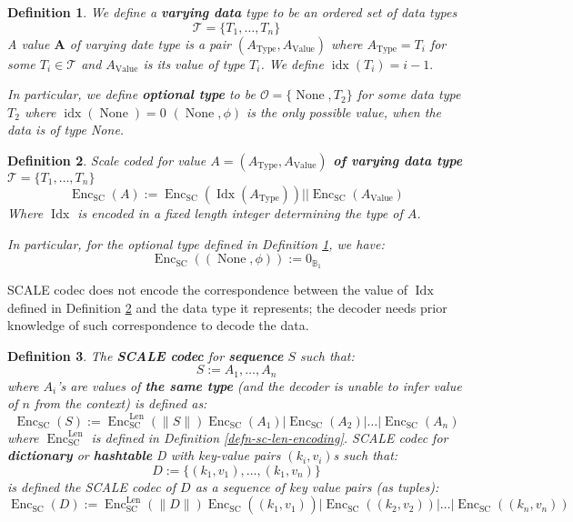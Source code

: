 \documentclass{article}
\newcommand{\assign}{:=}
\newcommand{\tmmathbf}[1]{\ensuremath{\boldsymbol{#1}}}
\newcommand{\tmop}[1]{\ensuremath{\operatorname{#1}}}
\newcommand{\tmstrong}[1]{\textbf{#1}}
\newcommand{\tmtextbf}[1]{{\bfseries{#1}}}
\newtheorem{definition}{Definition}
\providecommand{\tmop}[1]{\ensuremath{\mathrm{#1}}}
\providecommand{\tmstrong}[1]{\tmtextbf{#1}}
\providecommand{\tmtextbf}[1]{\tmtextbf{#1}}
\newtheorem{definition}{Definition}
\begin{document}
\begin{definition}
  \label{defn-varrying-data-type}We define a {\tmstrong{varying data}} type to
  be an ordered set of data types
  \[ \mathcal{T}= \{ T_1, \ldots, T_n \} \]
  A value $\tmmathbf{A}$ of varying date type is a pair $(A_{\tmop{Type}},
  A_{\tmop{Value}})$ where $A_{\tmop{Type}} = T_i$ for some $T_i \in
  \mathcal{T}$ and $A_{\tmop{Value}}$ is its value of type $T_i$. We define
  $\tmop{idx} (T_i) = i - 1.$
  
  In particular, we define {\tmstrong{optional type}} to be $\mathcal{O}= \{
  \tmop{None}, T_2 \}$ for some data type $T_2$ where $\tmop{idx}
  (\tmop{None}) = 0$ $(\tmop{None}, \phi)$ is the only possible value, when
  the data is of type None.
  
  
\end{definition}

\begin{definition}
  \label{defn-scale-variable-type}Scale coded for value {\tmstrong{$A =
  (A_{\tmop{Type}}, A_{\tmop{Value}})$ of varying data type}} $\mathcal{T}= \{
  T_1, \ldots, T_n \}$
  \[ \tmop{Enc}_{\tmop{SC}} (A) \assign \tmop{Enc}_{\tmop{SC}} (\tmop{Idx}
     (A_{\tmop{Type}})) | | \tmop{Enc}_{\tmop{SC}} (A_{\tmop{Value}}) \]
  Where $\tmop{Idx}$ is encoded in a fixed length integer determining the type
  of $A$.
  
  In particular, for the optional type defined in Definition
  \ref{defn-varrying-data-type}, we have:
  \[ \tmop{Enc}_{\tmop{SC}} ((\tmop{None}, \phi)) \assign 0_{\mathbb{B}_1} \]
\end{definition}

SCALE codec does not encode the correspondence between the value of
$\tmop{Idx}$ defined in Definition \ref{defn-scale-variable-type} and the data
type it represents; the decoder needs prior knowledge of such correspondence
to decode the data.

\begin{definition}
  \label{defn-scale-list}The {\tmstrong{SCALE codec}} for
  {\tmstrong{sequence}} $S$ such that:
  \[ S \assign A_1, \ldots, A_n \]
  where $A_i$'s are values of {\tmstrong{the same type}} (and the decoder is
  unable to infer value of $n$ from the context) is defined as:
  \[ \tmop{Enc}_{\tmop{SC}} (S) \assign \tmop{Enc}^{\tmop{Len}}_{\tmop{SC}}
     (\| S \|) \tmop{Enc}_{\tmop{SC}} (A_1) | \tmop{Enc}_{\tmop{SC}} (A_2) |
     \ldots | \tmop{Enc}_{\tmop{SC}} (A_n) \]
  where $\tmop{Enc}_{\tmop{SC}}^{\tmop{Len}}$ is defined in Definition
  \ref{defn-sc-len-encoding}. SCALE codec for {\tmstrong{dictionary}} or
  {\tmstrong{hashtable}} D with key-value pairs $(k_i, v_i)$s such that:
  \[ D \assign \{ (k_1, v_1), \ldots, (k_1, v_n) \} \]
  is defined the SCALE codec of $D$ as a sequence of key value pairs (as
  tuples):
  \[ \tmop{Enc}_{\tmop{SC}} (D) \assign \tmop{Enc}^{\tmop{Len}}_{\tmop{SC}}
     (\| D \|) \tmop{Enc}_{\tmop{SC}} ((k_1, v_1)_{}) | \tmop{Enc}_{\tmop{SC}}
     ((k_2, v_2)) | \ldots | \tmop{Enc}_{\tmop{SC}} ((k_n, v_n)) \]
  \[ \  \]
\end{definition}
\end{document}
